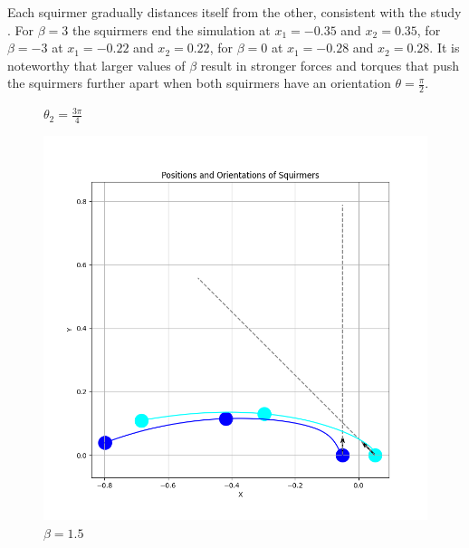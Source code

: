 \documentclass{article}
\begin{document}
Each squirmer gradually distances itself from the other, consistent with the study \cite{Stark}.
For $\beta = 3$ the squirmers end the simulation at $x_1 = -0.35$ and $x_2 = 0.35$,
for $\beta = -3$ at $x_1 = -0.22$ and $x_2 = 0.22$,
 for $\beta = 0$ at $x_1 = -0.28$ and $x_2 = 0.28$.
 It is noteworthy that larger values of $\beta$ result in stronger forces and torques that push the
 squirmers further apart when both squirmers have an orientation $\theta = \frac{\pi}{2}$.
 \begin{figure}[H]
    \centering
    \textbf{$\theta_2 = \frac{3\pi}{4}$}\par\medskip
    \begin{minipage}{0.49\textwidth}
        \includegraphics[width=1.1\textwidth]{graphs/simulations/sim_sq_sq/beta1_5/3pi_4_.png}
        \caption{\footnotesize $\beta = 1.5$}
    \end{minipage}\hfill
    \begin{minipage}{0.49\textwidth}

\end{minipage}
\end{figure}
\end{document}

